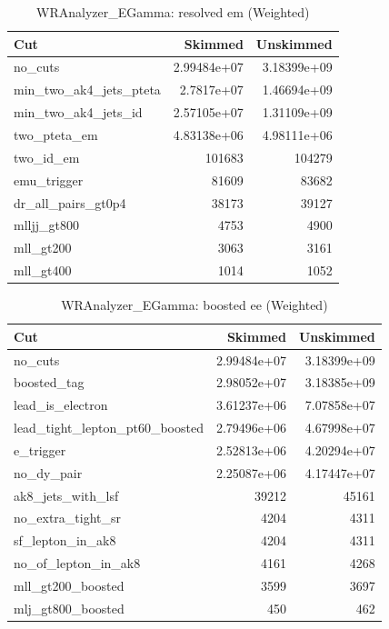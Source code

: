\documentclass{article}
\begin{document}
\begin{table}[htbp]
\centering
\caption{WRAnalyzer\_EGamma: resolved em (Weighted)}
\begin{tabular}{lrr}
\hline
Cut & Skimmed & Unskimmed \\
\hline
no\_cuts & 2.99484e+07 & 3.18399e+09 \\
min\_two\_ak4\_jets\_pteta & 2.7817e+07 & 1.46694e+09 \\
min\_two\_ak4\_jets\_id & 2.57105e+07 & 1.31109e+09 \\
two\_pteta\_em & 4.83138e+06 & 4.98111e+06 \\
two\_id\_em & 101683 & 104279 \\
emu\_trigger & 81609 & 83682 \\
dr\_all\_pairs\_gt0p4 & 38173 & 39127 \\
mlljj\_gt800 & 4753 & 4900 \\
mll\_gt200 & 3063 & 3161 \\
mll\_gt400 & 1014 & 1052 \\
\hline
\end{tabular}
\end{table}

\begin{table}[htbp]
\centering
\caption{WRAnalyzer\_EGamma: boosted ee (Weighted)}
\begin{tabular}{lrr}
\hline
Cut & Skimmed & Unskimmed \\
\hline
no\_cuts & 2.99484e+07 & 3.18399e+09 \\
boosted\_tag & 2.98052e+07 & 3.18385e+09 \\
lead\_is\_electron & 3.61237e+06 & 7.07858e+07 \\
lead\_tight\_lepton\_pt60\_boosted & 2.79496e+06 & 4.67998e+07 \\
e\_trigger & 2.52813e+06 & 4.20294e+07 \\
no\_dy\_pair & 2.25087e+06 & 4.17447e+07 \\
ak8\_jets\_with\_lsf & 39212 & 45161 \\
no\_extra\_tight\_sr & 4204 & 4311 \\
sf\_lepton\_in\_ak8 & 4204 & 4311 \\
no\_of\_lepton\_in\_ak8 & 4161 & 4268 \\
mll\_gt200\_boosted & 3599 & 3697 \\
mlj\_gt800\_boosted & 450 & 462 \\
\hline
\end{tabular}
\end{table}
\end{document}

